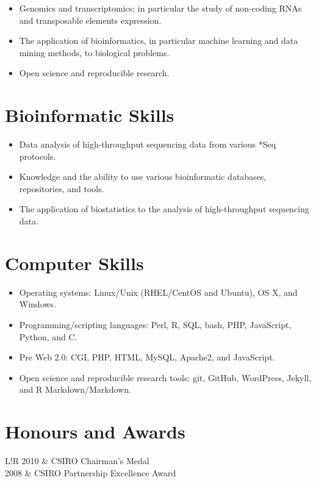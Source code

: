 \documentclass[a4paper, 10pt]{article}
\newcommand\VRule{\color{lightgray}\vrule width 0.5pt}
\begin{document}
\begin{itemize}
   \setlength\itemsep{0em}
   \item Genomics and transcriptomics; in particular the study of non-coding RNAs and transposable elements expression.
   \item The application of bioinformatics, in particular machine learning and data mining methods, to biological problems.
   \item Open science and reproducible research.
\end{itemize}

\section*{Bioinformatic Skills}

\begin{itemize}
   \setlength\itemsep{0em}
   \item Data analysis of high-throughput sequencing data from various *Seq protocols.
   \item Knowledge and the ability to use various bioinformatic databases, repositories, and tools.
   \item The application of biostatistics to the analysis of high-throughput sequencing data.
\end{itemize}

\section*{Computer Skills}

\begin{itemize}
   \setlength\itemsep{0em}
   \item Operating systems: Linux/Unix (RHEL/CentOS and Ubuntu), OS X, and Windows.
   \item Programming/scripting languages: Perl, R, SQL, bash, PHP, JavaScript, Python, and C.
   \item Pre Web 2.0: CGI, PHP, HTML, MySQL, Apache2, and JavaScript.
   \item Open science and reproducible research tools: git, GitHub, WordPress, Jekyll, and R Markdown/Markdown.
\end{itemize}

\section*{Honours and Awards}
\begin{tabular}{L!{\VRule}R}
   2010 & CSIRO Chairman's Medal \\
   2008 & CSIRO Partnership Excellence Award \\
\end{tabular}
\end{document}
